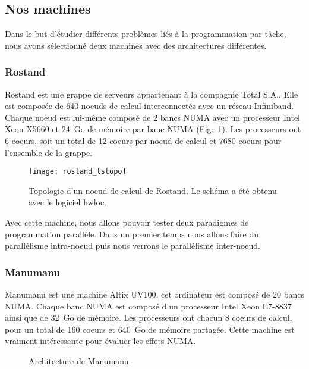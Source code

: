 \subsection{Nos machines}
Dans le but d'étudier différents problèmes liés à la programmation par tâche, nous avons sélectionné deux machines avec des architectures différentes.

\subsubsection{Rostand}
Rostand est une grappe de serveurs appartenant à la compagnie Total S.A..
%
Elle est composée de 640 noeuds de calcul interconnectés avec un réseau Infiniband.
%
Chaque noeud est lui-même composé de 2 bancs NUMA avec un processeur Intel Xeon X5660 et 24~Go de mémoire par banc NUMA (Fig.~\ref{fig:rostand}).
%
Les processeurs ont 6 coeurs, soit un total de 12 coeurs par noeud de calcul et 7680 coeurs pour l'ensemble de la grappe.

\begin{figure}[!ht]
        \centering
        \texttt{[image: rostand\_lstopo]}
        \caption{Topologie d'un noeud de calcul de Rostand. Le schéma a été obtenu avec le logiciel hwloc.}
        \label{fig:rostand}
\end{figure}

Avec cette machine, nous allons pouvoir tester deux paradigmes de programmation parallèle.
%
Dans un premier temps nous allons faire du parallélisme intra-noeud puis nous verrons le parallélisme inter-noeud.

\subsubsection{Manumanu}
Manumanu est une machine Altix UV100, cet ordinateur est composé de 20 bancs NUMA.
%
Chaque banc NUMA est composé d'un processeur Intel Xeon E7-8837 ainsi que de 32~Go de mémoire.
%
Les processeurs ont chacun 8 coeurs de calcul, pour un total de 160 coeurs et 640~Go de mémoire partagée.
%
Cette machine est vraiment intéressante pour évaluer les effets NUMA.

\begin{figure}[!ht]
     \begin{center}
    \end{center}
    \caption{Architecture de Manumanu.}
    \label{fig:manumanu}
\end{figure}

